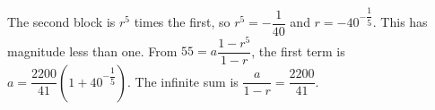 The second block is $r^5$ times the first, so $r^5=-\dfrac{1}{40}$ and $\boxed{r=-40^{-\dfrac{1}{5}}}$. This has magnitude less than one. From $55=a\dfrac{1-r^5}{1-r}$, the first term is $\boxed{a=\dfrac{2200}{41}(1+40^{-\dfrac{1}{5}})}$. The infinite sum is $\dfrac{a}{1-r}=\boxed{\dfrac{2200}{41}}$.
